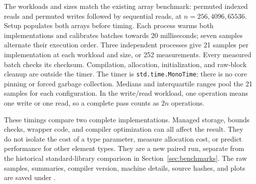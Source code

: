 The workloads and sizes match the existing array benchmark: permuted
indexed reads and permuted writes followed by sequential reads, at
$n=256,4096,65536$. Setup populates both arrays before timing. Each process
warms both implementations and calibrates batches towards 20 milliseconds;
seven samples alternate their execution order. Three independent processes
give 21 samples per implementation at each workload and size, or 252
measurements. Every measured batch checks its checksum. Compilation,
allocation, initialization, and raw-block cleanup are outside the timer.
The timer is \texttt{std.time.MonoTime}; there is no core pinning or forced
garbage collection. Medians and interquartile ranges pool the 21 samples
for each configuration. In the write/read workload, one operation means
one write or one read, so a complete pass counts as $2n$ operations.



These timings compare two complete implementations. Managed storage,
bounds checks, wrapper code, and compiler optimization can all affect the
result. They do not isolate the cost of a type parameter, measure allocation
cost, or predict performance for other element types. They are a new paired
run, separate from the historical standard-library comparison in
Section~\ref{sec:benchmarks}. The raw samples, summaries, compiler version,
machine details, source hashes, and plots are saved under
.
